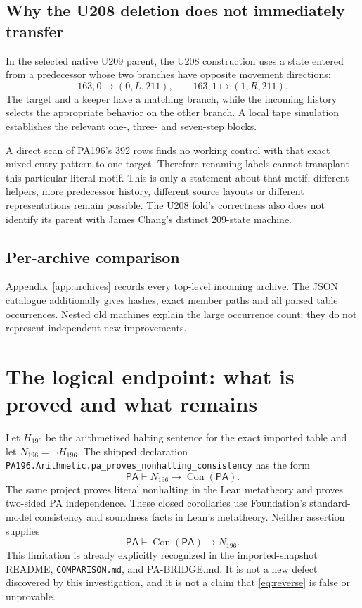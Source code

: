 \documentclass[10pt,letterpaper]{article}
\newcommand{\PA}{\mathsf{PA}}
\newcommand{\Con}{\operatorname{Con}}
\newcommand{\repo}{https://github.com/VladimirReshetnikov/ProveIt}
\newcommand{\pin}{906367250a7f96c923147b10df392294bced7be5}
\newcommand{\src}[2]{\href{\repo/blob/\pin/#1}{#2}}
\begin{document}
\subsection{Why the U208 deletion does not immediately transfer}

In the selected native U209 parent, the U208 construction uses a state entered
from a predecessor whose two branches have opposite movement directions:
\[
 163,0\mapsto(0,L,211),\qquad
 163,1\mapsto(1,R,211).
\]
The target and a keeper have a matching branch, while the incoming history
selects the appropriate behavior on the other branch. A local tape simulation
establishes the relevant one-, three- and seven-step blocks.

A direct scan of PA196's 392 rows finds no working control with that exact
mixed-entry pattern to one target. Therefore renaming labels cannot transplant
this particular literal motif. This is only a statement about that motif;
different helpers, more predecessor history, different source layouts or
different representations remain possible. The U208 fold's correctness also
does not identify its parent with James Chang's distinct 209-state machine.

\subsection{Per-archive comparison}

Appendix~\ref{app:archives} records every top-level incoming archive. The JSON
catalogue additionally gives hashes, exact member paths and all parsed table
occurrences. Nested old machines explain the large occurrence count; they do
not represent independent new improvements.

\section{The logical endpoint: what is proved and what remains}

Let $H_{196}$ be the arithmetized halting sentence for the exact imported
table and let $N_{196}=\neg H_{196}$. The shipped declaration
\texttt{PA196.Arithmetic.pa\_proves\_nonhalting\_consistency} has the form
\begin{equation}\label{eq:oneway}
 \PA\vdash N_{196}\to\Con(\PA).
\end{equation}
The same project proves literal nonhalting in the Lean metatheory and proves
two-sided PA independence. These closed corollaries use Foundation's
standard-model consistency and soundness facts in Lean's metatheory.
Neither assertion supplies
\begin{equation}\label{eq:reverse}
 \PA\vdash\Con(\PA)\to N_{196}.
\end{equation}
This limitation is already explicitly recognized in the imported-snapshot
README, \texttt{COMPARISON.md}, and
\src{Computability/BusyBeaver/Research/PA/pa196-vs-u208/PA-BRIDGE.md}{PA-BRIDGE.md}.
It is not a new defect discovered by this investigation, and it is not a claim
that \eqref{eq:reverse} is false or unprovable.
\end{document}
